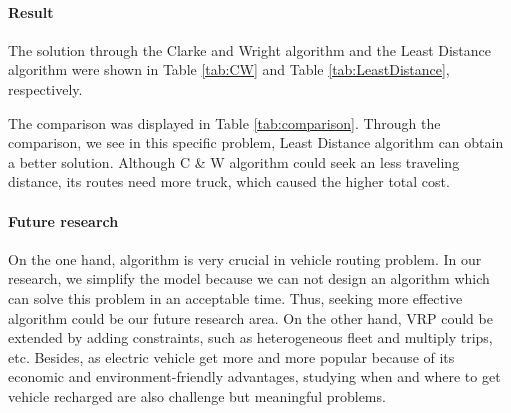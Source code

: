 \documentclass[12pt]{article}
\numberwithin{equation}{section}
\begin{document}
	\paragraph{Result}
	The solution through the Clarke and Wright algorithm and the Least Distance algorithm were shown in Table \ref{tab:CW} and Table \ref{tab:LeastDistance}, respectively.  

	The comparison was displayed in Table \ref{tab:comparison}. Through the comparison, we see in this specific problem, Least Distance algorithm can obtain a better solution. Although C \& W algorithm could seek an less traveling distance, its routes need more truck, which caused the higher total cost.	

	
	\paragraph{Future research}On the one hand, algorithm is very crucial in vehicle routing problem. In our research, we simplify the model because we can not design an algorithm which can solve this problem in an acceptable time. Thus, seeking more effective algorithm could be our future research area. On the other hand, VRP could be extended by adding constraints, such as heterogeneous fleet and multiply trips, etc. Besides,  as electric vehicle get more and more popular because of its economic and environment-friendly advantages, studying when and where to get vehicle recharged are also challenge but meaningful problems.
	    
\newpage

\nocite{*}
\printbibliography

\newpage

	
\end{document}
